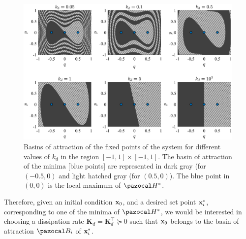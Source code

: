 %
\begin{figure}[!ht]
	\centering
	\includegraphics[width=\textwidth]{Figures/basin6.eps}
	\caption[Basins of attraction of the fixed points of the system for different values of $k_d$]{Basins of attraction of the fixed points of the system for different values of $k_d$ in the region $[-1,1]\times [-1,1]$. The basin of attraction of the minima [blue points] are represented in dark gray (for $(-0.5,0)$ and light hatched gray (for $(0.5,0)$). The blue point in $(0,0)$ is the local maximum of $\Ha^*$.}
	\label{fig:basin}
\end{figure}
%
\newline

%
Therefore, given an initial condition $\mathbf{x}_0$, and a desired set point $\mathbf{x}_i^*$, corresponding to one of the minima of $\Ha^*$, we would be interested in choosing a dissipation rate $\mathbf{K}_d=\mathbf{K}_d^\top\succeq 0$ such that $\mathbf{x}_0$ belongs to the basin of attraction $\B_i$ of $\mathbf{x}_i^*$. 

